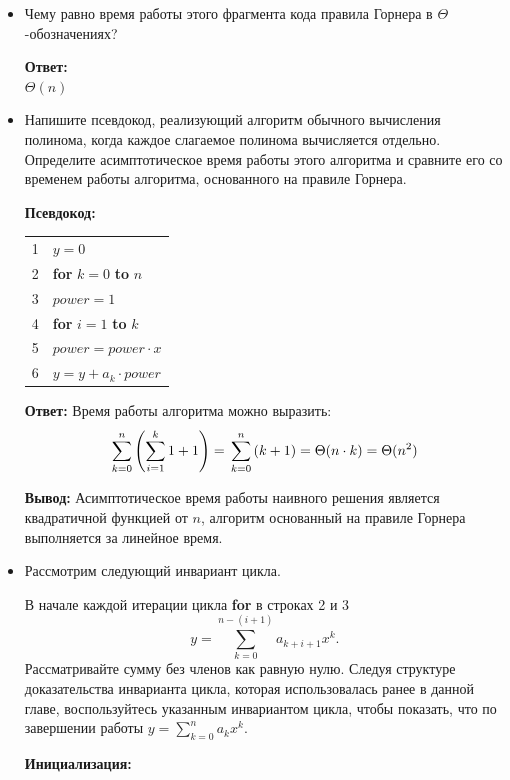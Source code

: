 \begin{itemize}
    \item[\textbf{а.}] Чему равно время работы этого фрагмента кода правила Горнера в $\Theta$-обозначениях?
    
    \textbf{Ответ:} \\
    $\Theta(n)$

    \item[\textbf{б.}] Напишите псевдокод, реализующий алгоритм обычного вычисления полинома, когда каждое слагаемое полинома вычисляется отдельно. Определите асимптотическое время работы этого алгоритма и сравните его со временем работы алгоритма, основанного на правиле Горнера.
    
    \textbf{Псевдокод:}

    \medskip
    \begin{tabular}{ll}
    1 & $y = 0$ \\
    2 & \textbf{for} $k = 0$ \textbf{to} $n$ \\
    3 & \quad $power = 1$ \\
    4 & \quad \textbf{for} $i = 1$ \textbf{to} $k$ \\
    5 & \quad \quad $power = power \cdot x$ \\
    6 & \quad $y = y + a_k \cdot power$
    \end{tabular}
    \medskip

    \textbf{Ответ:} Время работы алгоритма можно выразить: 
   \[
   \sum_{k = 0}^{n} {\left( \sum_{i = 1}^{k} {1} + 1 \right)} = \\
   \sum_{k = 0}^{n} {\left( k + 1 \right)} = \Theta(n \cdot k) = \Theta(n^2)
    \]

    \textbf{Вывод:} Асимптотическое время работы наивного решения является квадратичной функцией от $n$,
    алгоритм основанный на правиле Горнера выполняется за линейное время.

    \item[\textbf{в.}] Рассмотрим следующий инвариант цикла.
    
    В начале каждой итерации цикла \textbf{for} в строках 2 и 3
    \[
    y = \sum_{k=0}^{n-(i+1)} a_{k+i+1} x^k \text{.}
    \]
    Рассматривайте сумму без членов как равную нулю. Следуя структуре доказательства инварианта цикла, которая использовалась ранее в данной главе, воспользуйтесь указанным инвариантом цикла, чтобы показать, что по завершении работы $y = \sum_{k=0}^n a_k x^k$.
    
    \textbf{Инициализация:}
    

\end{itemize}
